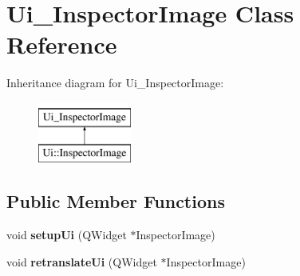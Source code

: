 \hypertarget{class_ui___inspector_image}{}\section{Ui\+\_\+\+Inspector\+Image Class Reference}
\label{class_ui___inspector_image}
Inheritance diagram for Ui\+\_\+\+Inspector\+Image\+:\begin{figure}[H]
\begin{center}
\leavevmode
\includegraphics[height=2.000000cm]{class_ui___inspector_image}
\end{center}
\end{figure}
\subsection*{Public Member Functions}
\begin{DoxyCompactItemize}
\item 
\mbox{\label{class_ui___inspector_image_aef8b07752d9c5d48cbde6c31aceb568e}} 
void {\bfseries setup\+Ui} (Q\+Widget $\ast$Inspector\+Image)
\item 
\mbox{\label{class_ui___inspector_image_a7e0e07487dd61d1b96a831fefa3e704a}} 
void {\bfseries retranslate\+Ui} (Q\+Widget $\ast$Inspector\+Image)
\end{DoxyCompactItemize}
